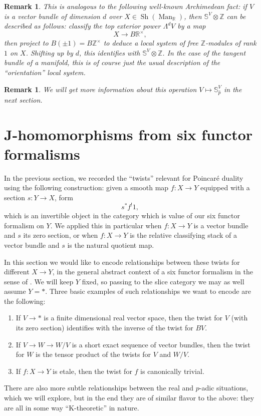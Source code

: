 \documentclass[12pt]{article}
\newtheorem{remark}[theorem]{Remark}
\newcommand{\on}{\operatorname}
\newcommand{\mbb}{\mathbb}
\newcommand{\wh}{\widehat}
\begin{document}
\begin{remark}
This is analogous to the following well-known Archimedean fact: if $V$ is a vector bundle of dimension $d$ over $X\in\on{Sh}(\on{Man}_{\mbb{R}})$, then $\mbb{S}^V\otimes\mathbb{Z}$ can be described as follows: classify the top exterior power $\Lambda^dV$ by a map
$$X \to B\mathbb{R}^\times,$$
then project to $B(\pm 1) = B\mathbb{Z}^\times$ to deduce a local system of free $\mathbb{Z}$-modules of rank $1$ on $X$.  Shifting up by $d$, this identifies with $\mbb{S}^V\otimes\mathbb{Z}$.  In the case of the tangent bundle of a manifold, this is of course just the usual description of the ``orientation'' local system.
\end{remark}

\begin{remark}
We will get more information about this operation $V\mapsto \mbb{S}_{\wh{p}}^V$ in the next section.
\end{remark}

\section{J-homomorphisms from six functor formalisms}\label{jsec}

In the previous section, we recorded the ``twists'' relevant for Poincaré duality using the following construction: given a smooth map $f:X\to Y$ equipped with a section $s:Y\to X$, form
$$s^\ast f^!1,$$
which is an invertible object in the category which is value of our six functor formalism on $Y$.  We applied this in particular when $f:X\to Y$ is a vector bundle and $s$ its zero section, or when $f:X\to Y$ is the relative classifying stack of a vector bundle and $s$ is the natural quotient map.

In this section we would like to encode relationships between these twists for different $X\to Y$, in the general abstract context of a six functor formalism in the sense of \cite{HeyerSixFunctors}.  We will keep $Y$ fixed, so passing to the slice category we may as well assume $Y=\ast$.  Three basic examples of such relationships we want to encode are the following:
\begin{enumerate}
\item If $V\to \ast$ is a finite dimensional real vector space, then the twist for $V$ (with its zero section) identifies with the inverse of the twist for $BV$.
\item If $V \to W \to W/V$ is a short exact sequence of vector bundles, then the twist for $W$ is the tensor product of the twists for $V$ and $W/V$.
\item If $f:X\to Y$ is etale, then the twist for $f$ is canonically trivial.
\end{enumerate}
There are also more subtle relationships between the real and $p$-adic situations, which we will explore, but in the end they are of similar flavor to the above: they are all in some way ``K-theoretic'' in nature.
\end{document}
